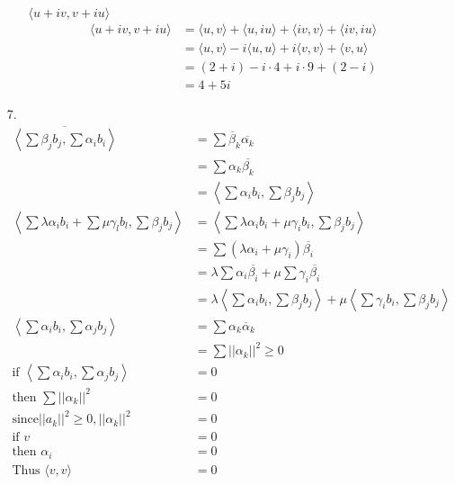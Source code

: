 \documentclass{article}
\begin{document}
\begin{itemize}
\begin{itemize}
\begin{align*}
        \end{align*}
        \item [\(\langle u+iv,v+iu \rangle\)]
        \begin{align*}
            \langle u+iv,v+iu\rangle &=\langle u,v\rangle +\langle u,iu\rangle +\langle iv,v\rangle +\langle iv,iu\rangle \\
            &=\langle u,v\rangle -i\langle u,u\rangle +i\langle v,v\rangle +\langle v,u\rangle \\
            &=(2+i)-i\cdot 4+i\cdot 9+(2-i)\\
            &=4+5i
        \end{align*}
    \end{itemize}
    \item [7.]
    \begin{align*}
        \overline{\left\langle\sum \beta_jb_j, \sum \alpha_ib_i\right\rangle}&=\overline{\sum \beta_k\overline{\alpha_k}}\\
        &=\sum \alpha_k\overline{\beta_k}\\
        &=\left\langle\sum \alpha_ib_i,\sum \beta_jb_j\right\rangle\\
        \left\langle \sum \lambda\alpha_ib_i+\sum\mu\gamma_lb_l,\sum \beta_jb_j\right\rangle &=\left\langle \sum\lambda \alpha_ib_i+\mu\gamma_ib_i,\sum \beta_jb_j\right\rangle\\
        &=\sum (\lambda\alpha_i+\mu\gamma_i)\overline{\beta_i}\\
        &=\lambda\sum \alpha_i \overline{\beta_i}+\mu\sum \gamma_i\overline{\beta_i}\\
        &=\lambda \left\langle \sum \alpha_ib_i,\sum \beta_jb_j\right\rangle+\mu \left\langle \sum\gamma_ib_i,\sum \beta_jb_j\right\rangle\\
        \left\langle \sum \alpha_ib_i,\sum \alpha_jb_j\right\rangle &=\sum \alpha_k\overline{\alpha}_k\\
        &=\sum ||\alpha_k||^2 \geq0\\
        \text{if }\left\langle \sum \alpha_ib_i,\sum \alpha_jb_j\right\rangle &= 0\\
        \text{then }\sum ||\alpha_k||^2 &= 0\\
        \text{since} ||a_k||^2\geq 0, ||\alpha_k||^2&=0\\
        \text{if } v&=0\\
        \text{then } \alpha_i &=0\\
        \text{Thus } \langle v,v\rangle&=0
    \end{align*}

\end{itemize}
\end{document}
